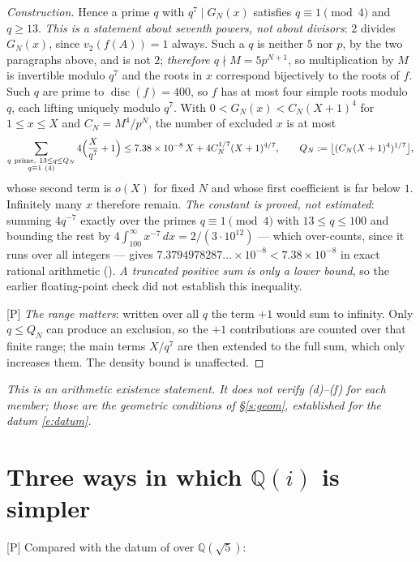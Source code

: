 \documentclass[11pt]{article}
\theoremstyle{plain}
\theoremstyle{definition}
\begin{document}
\begin{proof}[Construction]
Hence a prime $q$ with $q^{7}\mid G_N(x)$ satisfies $q\equiv1\pmod4$ and $q\ge13$.
\emph{This is a statement about seventh powers, not about divisors}: $2$ divides
$G_N(x)$, since $v_2(f(A))=1$ always.  Such a $q$ is neither $5$ nor $p$, by the two
paragraphs above, and is not $2$; \emph{therefore $q\nmid M=5p^{N+1}$}, so multiplication
by $M$ is invertible modulo $q^{7}$ and the roots in $x$ correspond bijectively to the
roots of $f$.  Such $q$
are prime to $\operatorname{disc}(f)=400$, so $f$ has at most four simple roots
modulo $q$, each lifting uniquely modulo $q^7$.  With
$0<G_N(x)<C_N(X+1)^4$ for $1\le x\le X$ and $C_N=M^4/p^N$, the number of excluded
$x$ is at most
\[
 \sum_{\substack{q\ \mathrm{prime},\ 13\le q\le Q_N\\ q\equiv1\ (4)}}
 4\Bigl(\frac{X}{q^7}+1\Bigr)
 \le 7.38\times10^{-8}\,X+4C_N^{1/7}(X+1)^{4/7},
 \qquad Q_N:=\bigl\lfloor(C_N(X+1)^4)^{1/7}\bigr\rfloor,
\]
whose second term is $o(X)$ for fixed $N$ and whose first coefficient is far below
$1$.  Infinitely many $x$ therefore remain.  \emph{The constant is proved, not
estimated}: summing $4q^{-7}$ exactly over the primes $q\equiv1\pmod4$ with
$13\le q\le100$ and bounding the rest by $4\int_{100}^{\infty}x^{-7}\,dx=2/(3\cdot10^{12})$
--- which over-counts, since it runs over all integers --- gives
$7.3794978287\ldots\times10^{-8}<7.38\times10^{-8}$ in exact rational arithmetic
().  \emph{A truncated positive sum is only a lower bound},
so the earlier floating-point check did not establish this inequality.

\textup{[P]} \emph{The range matters}: written over all $q$ the term $+1$ would sum
to infinity.  Only $q\le Q_N$ can produce an exclusion, so the $+1$ contributions are
counted over that finite range; the main terms $X/q^{7}$ are then extended to the full
sum, which only increases them.  The density bound is unaffected.
\end{proof}

\emph{This is an arithmetic existence statement.  It does not verify (d)--(f) for
each member; those are the geometric conditions of \S\ref{s:geom}, established for
the datum \eqref{e:datum}.}

\section{\texorpdfstring{Three ways in which $\mathbb{Q}(i)$ is simpler}{Three ways in which Q(i) is simpler}}\label{s:easier}

\textup{[P]} Compared with the datum of \cite{First} over $\mathbb{Q}(\sqrt5)$:
\end{document}
